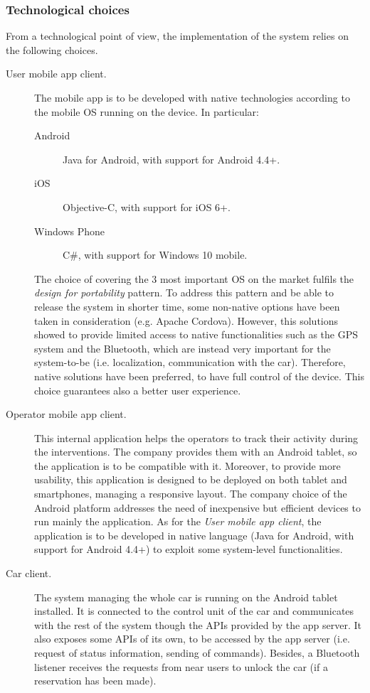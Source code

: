 \subsubsection{Technological choices}
	From a technological point of view, the implementation of the system relies on the following choices.
	\begin{description}
		\item[User mobile app client.] The mobile app is to be developed with native technologies according to the mobile OS running on the device. In particular:
			\begin{description}
				\item[Android] Java for Android, with support for Android 4.4+.
				\item[iOS] Objective-C, with support for iOS 6+.
				\item[Windows Phone] C\#, with support for Windows 10 mobile.
			\end{description}
		The choice of covering the 3 most important OS on the market fulfils the \textit{design for portability} pattern. To address this pattern and be able to release the system in shorter time, some non-native options have been taken in consideration (e.g. Apache Cordova). However, this solutions showed to provide limited access to native functionalities such as the GPS system and the Bluetooth, which are instead very important for the system-to-be (i.e. localization, communication with the car). Therefore, native solutions have been preferred, to have full control of the device. This choice guarantees also a better user experience.

		\item[Operator mobile app client.] This internal application helps the operators to track their activity during the interventions. The company provides them with an Android tablet, so the application is to be compatible with it. Moreover, to provide more usability, this application is designed to be deployed on both tablet and smartphones, managing a responsive layout. The company choice of the Android platform addresses the need of inexpensive but efficient devices to run mainly the application. As for the \textit{User mobile app client}, the application is to be developed in native language (Java for Android, with support for Android 4.4+) to exploit some system-level functionalities.

		\item[Car client.] The system managing the whole car is running on the Android tablet installed. It is connected to the control unit of the car and communicates with the rest of the system though the APIs provided by the app server. It also exposes some APIs of its own, to be accessed by the app server (i.e. request of status information, sending of commands). Besides, a Bluetooth listener receives the requests from near users to unlock the car (if a reservation has been made).


\end{description}
